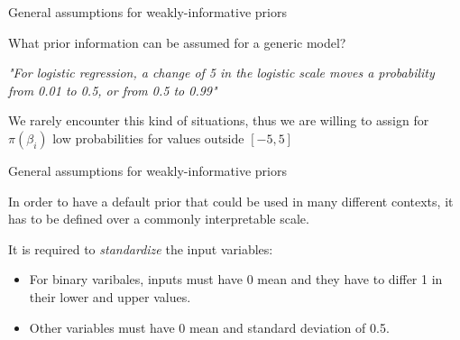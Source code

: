 \documentclass{beamer}
\begin{document}
\begin{frame}{General assumptions for weakly-informative priors}
	
	 What prior information can be assumed for a generic model?
	
	\vspace{0.2cm}
	
	\textit{"For logistic regression, a change of 5 in the logistic scale moves a probability from 0.01 to 0.5, or from 0.5 to 0.99"}
	
	
	
	We rarely encounter this kind of situations, thus  we are willing to assign for $\pi(\beta_i)$ low probabilities for values outside $ [-5, 5]$
	
\end{frame}


\begin{frame}{General assumptions for weakly-informative priors}
	
	In order to have a default prior that could be used in many different contexts, it has to be defined over a commonly interpretable scale.
	
	\vspace{0.4cm}
	It is required to \textit{standardize} the input variables:
	\begin{itemize}
		\item For binary varibales, inputs must have 0 mean and they have to differ 1 in their lower and upper values.
		\item Other variables must have 0 mean and standard deviation of 0.5.
	\end{itemize}
	
\end{frame}
\end{document}
